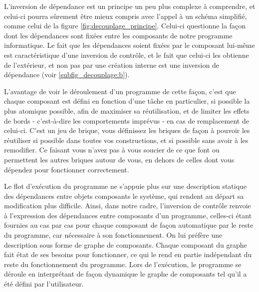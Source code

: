 L'inversion de dépendance est un principe un peu plus complexe à comprendre, et celui-ci pourra sûrement être mieux compris avec l'appel à un schéma simplifié, comme celui de la figure \ref{fig:decouplage_principe}. Celui-ci questionne la façon dont les dépendances sont fixées entre les composants de notre programme informatique. Le fait que les dépendances soient fixées par le composant lui-même est caractéristique d'une inversion de contrôle, et le fait que celui-ci les obtienne de l'extérieur, et non pas par une création interne est une inversion de dépendance (voir \ref{subfig_decouplage:b}).

L'avantage de voir le déroulement d'un programme de cette façon, c'est que chaque composant est défini en fonction d'une tâche en particulier, si possible la plus atomique possible, afin de maximiser sa réutilisation, et de limiter les effets de bords - c'est-à-dire les comportements imprévus - en cas de remplacement de celui-ci. C'est un jeu de brique, vous définissez les briques de façon à pouvoir les réutiliser si possible dans toutes vos constructions, et si possible sans avoir à les remodifier. Ce faisant vous n'avez pas à vous soucier de ce que font ou permettent les autres briques autour de vous, en dehors de celles dont vous dépendez pour fonctionner correctement.

Le flot d'exécution du programme ne s'appuie plus sur une description statique des dépendances entre objets composants le système, qui rendent au départ sa modification plus difficile. Ainsi, dans notre cadre, l'inversion de contrôle renvoie à l'expression des dépendances entre composants d'un programme, celles-ci étant fournies au cas par cas pour chaque composant de façon automatique par le reste du programme, car nécessaire à son fonctionnement. On lui préfère une description sous forme de graphe de composants. Chaque composant du graphe fait état de ses besoins pour fonctionner, ce qui le rend en partie indépendant du reste du fonctionnement du programme. Lors de l'exécution, le programme se déroule en interprétant de façon dynamique le graphe de composants tel qu'il a été défini par l'utilisateur.

